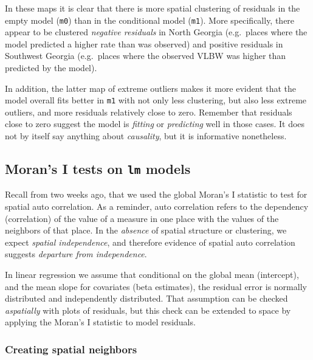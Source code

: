 \documentclass[
]{book}
\newcommand{\passthrough}[1]{#1}
\begin{document}
In these maps it is clear that there is more spatial clustering of residuals in the empty model (\passthrough{\lstinline!m0!}) than in the conditional model (\passthrough{\lstinline!m1!}). More specifically, there appear to be clustered \emph{negative residuals} in North Georgia (e.g.~places where the model predicted a higher rate than was observed) and positive residuals in Southwest Georgia (e.g.~places where the observed VLBW was higher than predicted by the model).

In addition, the latter map of extreme outliers makes it more evident that the model overall fits better in \passthrough{\lstinline!m1!} with not only less clustering, but also less extreme outliers, and more residuals relatively close to zero. Remember that residuals close to zero suggest the model is \emph{fitting} or \emph{predicting} well in those cases. It does not by itself say anything about \emph{causality}, but it is informative nonetheless.

\hypertarget{morans-i-tests-on-lm-models}{%
\subsection{\texorpdfstring{Moran's I tests on \texttt{lm} models}{Moran's I tests on lm models}}\label{morans-i-tests-on-lm-models}}

Recall from two weeks ago, that we used the global Moran's I statistic to test for spatial auto correlation. As a reminder, auto correlation refers to the dependency (correlation) of the value of a measure in one place with the values of the neighbors of that place. In the \emph{absence} of spatial structure or clustering, we expect \emph{spatial independence}, and therefore evidence of spatial auto correlation suggests \emph{departure from independence}.

In linear regression we assume that conditional on the global mean (intercept), and the mean slope for covariates (beta estimates), the residual error is normally distributed and independently distributed. That assumption can be checked \emph{aspatially} with plots of residuals, but this check can be extended to space by applying the Moran's I statistic to model residuals.

\hypertarget{creating-spatial-neighbors}{%
\subsubsection{Creating spatial neighbors}\label{creating-spatial-neighbors}}
\end{document}
